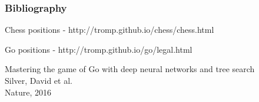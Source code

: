 \documentclass{beamer}
\begin{document}
\begin{frame} %
\frametitle{Bibliography}
\begin{thebibliography}{9}
	Chess positions - http://tromp.github.io/chess/chess.html

	Go positions - http://tromp.github.io/go/legal.html

	Mastering the game of Go with deep neural networks and tree search\\
	Silver, David et al.\\
	Nature, 2016
\end{thebibliography}
\end{frame}
\end{document}
